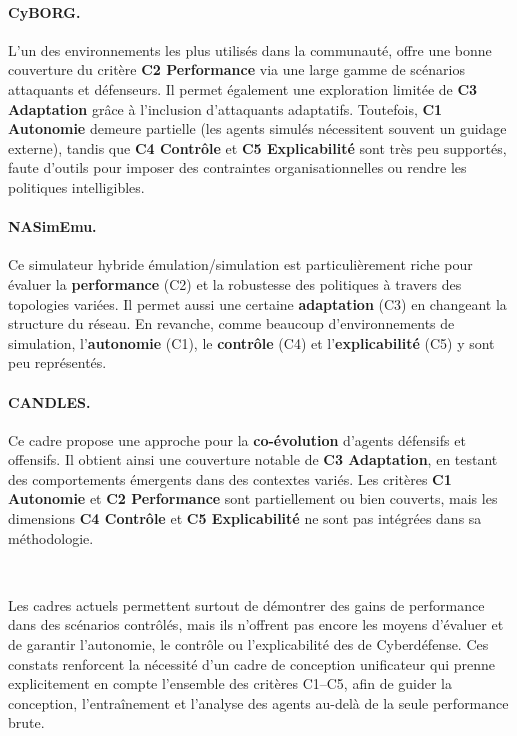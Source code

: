 \paragraph{CyBORG.} L'un des environnements les plus utilisés dans la communauté,  offre une bonne couverture du critère \textbf{C2 Performance} via une large gamme de scénarios attaquants et défenseurs. Il permet également une exploration limitée de \textbf{C3 Adaptation} grâce à l'inclusion d'attaquants adaptatifs. Toutefois, \textbf{C1 Autonomie} demeure partielle (les agents simulés nécessitent souvent un guidage externe), tandis que \textbf{C4 Contrôle} et \textbf{C5 Explicabilité} sont très peu supportés, faute d'outils pour imposer des contraintes organisationnelles ou rendre les politiques intelligibles.

\paragraph{NASimEmu.} Ce simulateur hybride émulation/simulation est particulièrement riche pour évaluer la \textbf{performance} (C2) et la robustesse des politiques à travers des topologies variées. Il permet aussi une certaine \textbf{adaptation} (C3) en changeant la structure du réseau. En revanche, comme beaucoup d'environnements de simulation, l'\textbf{autonomie} (C1), le \textbf{contrôle} (C4) et l'\textbf{explicabilité} (C5) y sont peu représentés.

\paragraph{CANDLES.} Ce cadre propose une approche pour la \textbf{co-évolution} d'agents défensifs et offensifs. Il obtient ainsi une couverture notable de \textbf{C3 Adaptation}, en testant des comportements émergents dans des contextes variés. Les critères \textbf{C1 Autonomie} et \textbf{C2 Performance} sont partiellement ou bien couverts, mais les dimensions \textbf{C4 Contrôle} et \textbf{C5 Explicabilité} ne sont pas intégrées dans sa méthodologie.

\

\noindent Les cadres actuels permettent surtout de démontrer des gains de performance dans des scénarios contrôlés, mais ils n'offrent pas encore les moyens d'évaluer et de garantir l'autonomie, le contrôle ou l'explicabilité des  de Cyberdéfense. Ces constats renforcent la nécessité d'un cadre de conception unificateur qui prenne explicitement en compte l'ensemble des critères C1--C5, afin de guider la conception, l'entraînement et l'analyse des agents au-delà de la seule performance brute.

